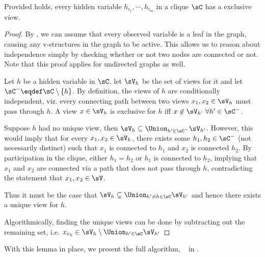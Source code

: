 \begin{lemma}
  Provided  holds, every hidden variable
    $h_{i_1}, \cdots, h_{i_m}$ in a clique $\sC$ has a exclusive view.
\end{lemma}
\begin{proof}
  By , we can assume that every observed
  variable is a leaf in the graph, causing any v-structures in the graph
  to be active. This allows us to reason about independence simply by
  checking whether or not two nodes are connected or not. Note that this
  proof applies for undirected graphs as well.

  Let $h$ be a hidden variable in $\sC$, let $\sV_{h}$ be the set of
    views for it and let $\sC^- \eqdef \sC \setminus \{h\}$.
  By definition, the views of $h$ are conditionally independent, viz.
    every connecting path between two views $x_1, x_2 \in \sV_h$ must pass through
    $h$.
  A view $x \in \sV_{h}$ is exclusive for $h$ iff $x \not\in \sV_{h'} ~ \forall h'
  \in \sC^-$.

  Suppose $h$ had no unique view, then $\sV_{h} \subseteq \Union_{h' \in \sC^-} \sV_{h'}$. 
  However, this would imply that for every $x_1, x_2 \in \sV_{h}$, there
    exists some $h_1, h_2 \in \sC^-$ (not necessarily distinct) such that
    $x_1$ is connected to $h_1$ and $x_2$ is connected $h_2$.
  By participation in the clique, either $h_1 = h_2$ or $h_1$ is
    connected to $h_2$, implying that $x_1$ and $x_2$ are connected
    via a path that does not pass through $h$, contradicting the
    statement that $x_1, x_2 \in \sV$. 
    
  Thus it must be the case that $\sV_{h} \subsetneq \Union_{h' \neq
    h \in \sC} \sV_{h'}$ and hence there exists a unique view for $h$.

  Algorithmically, finding the unique views can be done by subtracting
    out the remaining set, i.e. $x_{v_h} \in \sV_h \setminus \Union_{h'
    \in \sC} \sV_{h'}$
\end{proof}


With this lemma in place, we present the full algorithm, \LearnMarginals~
in .

